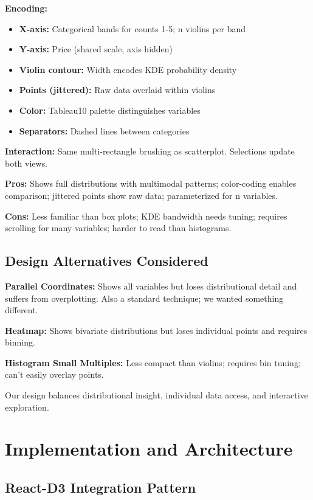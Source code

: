 \documentclass[sigplan,screen]{acmart}
\begin{document}
\textbf{Encoding:}
\begin{itemize}
\item \textbf{X-axis:} Categorical bands for counts 1-5; n violins per
      band
\item \textbf{Y-axis:} Price (shared scale, axis hidden)
\item \textbf{Violin contour:} Width encodes KDE probability density
\item \textbf{Points (jittered):} Raw data overlaid within violins
\item \textbf{Color:} Tableau10 palette distinguishes variables
\item \textbf{Separators:} Dashed lines between categories
\end{itemize}

\textbf{Interaction:}
Same multi-rectangle brushing as scatterplot. Selections update both
views.

\textbf{Pros:} Shows full distributions with multimodal patterns;
color-coding enables comparison; jittered points show raw data;
parameterized for n variables.

\textbf{Cons:} Less familiar than box plots; KDE bandwidth needs tuning;
requires scrolling for many variables; harder to read than
histograms.

\subsection{Design Alternatives Considered}

\textbf{Parallel Coordinates:} Shows all variables but loses
distributional detail and suffers from overplotting. Also a standard
technique; we wanted something different.

\textbf{Heatmap:} Shows bivariate distributions but loses individual
points and requires binning.

\textbf{Histogram Small Multiples:} Less compact than violins; requires
bin tuning; can't easily overlay points.

Our design balances distributional insight, individual data access, and
interactive exploration.

\section{Implementation and Architecture}
\label{sec:implementation}

\subsection{React-D3 Integration Pattern}
\end{document}
